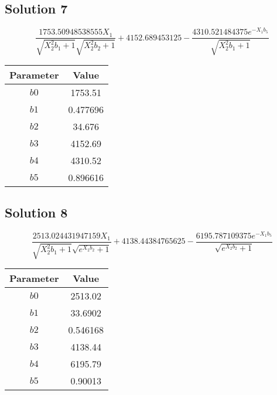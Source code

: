 \documentclass{article}
\begin{document}
\vspace{1em}
\subsection*{Solution 7}
\[
\frac{1753.50948538555 X_{1}}{\sqrt{X_{2}^{2} b_{1} + 1} \sqrt{X_{2}^{2} b_{2} + 1}} + 4152.689453125 - \frac{4310.521484375 e^{- X_{1} b_{5}}}{\sqrt{X_{2}^{2} b_{1} + 1}}
\]
\begin{center}
\begin{tabular}{cc}
\toprule
Parameter & Value \\
\midrule
$b0$ & 1753.51 \\
$b1$ & 0.477696 \\
$b2$ & 34.676 \\
$b3$ & 4152.69 \\
$b4$ & 4310.52 \\
$b5$ & 0.896616 \\
\bottomrule
\end{tabular}
\end{center}

\vspace{1em}
\subsection*{Solution 8}
\[
\frac{2513.024431947159 X_{1}}{\sqrt{X_{2}^{2} b_{1} + 1} \sqrt{e^{X_{2} b_{2}} + 1}} + 4138.44384765625 - \frac{6195.787109375 e^{- X_{1} b_{5}}}{\sqrt{e^{X_{2} b_{2}} + 1}}
\]
\begin{center}
\begin{tabular}{cc}
\toprule
Parameter & Value \\
\midrule
$b0$ & 2513.02 \\
$b1$ & 33.6902 \\
$b2$ & 0.546168 \\
$b3$ & 4138.44 \\
$b4$ & 6195.79 \\
$b5$ & 0.90013 \\
\bottomrule
\end{tabular}
\end{center}

\vspace{1em}
\end{document}

